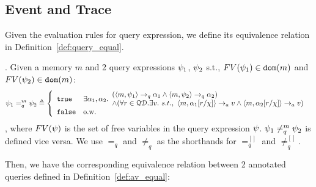 {\subsection{Event and Trace}
%
%
%
%
%
%
%
Given the evaluation rules for query expression, we define its equivalence relation in Definition~\ref{def:query_equal}.
%
\begin{defn}.
%
\label{def:query_equal}
 Given a memory $m$ and 2 query expressions $\psi_1$, $\psi_2$ s.t., $FV(\psi_1) \in \mathtt{dom}(m)$ and $FV(\psi_2) \in \mathtt{dom}(m)$:
$$
\qexpr_1 =_{q}^{m} \qexpr_2 \triangleq
\left\{
    \begin{array}{ll} 
      \etrue      
      & 
    \exists \qval_1, \qval_2.
    \begin{array}{l} 
      (\config{m,  \qexpr_1} \qarrow \qval_1 \land \config{m,  \qexpr_2 } \qarrow \qval_2) 
      \\
      \land (\forall r \in \qdom. \exists v. ~ s.t., ~ 
            \config{m, \qval_1[r/\chi]} \aarrow v \land \config{m,  \qval_2[r/\chi] } \aarrow v)  
    \end{array}\\
      \efalse         
      & \text{o.w.} 
    \end{array}
    \right.
$$
%
, where $FV(\psi)$ is the set of free variables in the query expression $\psi$.
$\psi_1 \neq_{q}^{m} \psi_2$  is defined vice versa.
%
We use $=_{q}$  and $\neq_{q}$ as the shorthands for $=_{q}^{[]}$ and $\neq^{[]}_{q}$.
\end{defn}
%
Then, we have the corresponding equivalence relation between 2 annotated queries defined in Definition~\ref{def:av_equal}:
%
}
